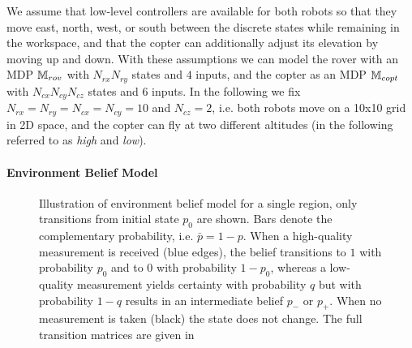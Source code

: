\documentclass[conference]{IEEEtran}
\begin{document}
We assume that low-level controllers are available for both robots so that they move east, north, west, or south between the discrete states while remaining in the workspace, and that the copter can additionally adjust its elevation by moving up and down. With these assumptions we can model the rover with an MDP $\mathbb{M}_{rov}$ with $N_{rx} N_{ry}$ states and $4$ inputs, and the copter as an MDP $\mathbb{M}_{copt}$ with $N_{cx} N_{cy} N_{cz}$ states and $6$ inputs. In the following we fix $N_{rx} = N_{ry} = N_{cx} = N_{cy} = 10$ and $N_{cz} = 2$, i.e. both robots move on a 10x10 grid in 2D space, and the copter can fly at two different altitudes (in the following referred to as \emph{high} and \emph{low}).


\paragraph{Environment Belief Model}

\begin{figure}
  \begin{center}
  \end{center}
  \caption{Illustration of environment belief model for a single region, only transitions from initial state $p_0$ are shown. Bars denote the complementary probability, i.e. $\bar p = 1-p$. When a high-quality measurement is received (blue edges), the belief transitions to $1$ with probability $p_0$ and to $0$ with probability $1-p_0$, whereas a low-quality measurement yields certainty with probability $q$ but with probability $1-q$ results in an intermediate belief $p_-$ or $p_+$. When no measurement is taken (black) the state does not change. The full transition matrices are given in}
  \label{fig:envmdp}
\end{figure}
\end{document}

